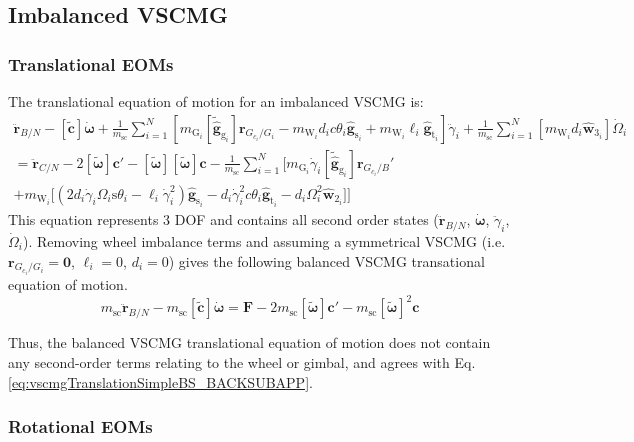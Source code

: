 \subsection{Imbalanced VSCMG}

\subsubsection{Translational EOMs}
The translational equation of motion for an imbalanced VSCMG is:
\begin{multline}
\ddot{\bm r}_{B/N} - [\tilde{\bm{c}}]\dot{\bm \omega}
+ \frac{1}{m_{\text{sc}}} \sum\limits_{i=1}^{N} \left[ m_{\text{G}_i} \left[\tilde{\hat{\bm g}}_{\text{g}_i} \right] \bm{r}_{G_{c_i}/G_i} - m_{\text{W}_i}d_ic\theta_i\hat{\bm{g}}_{\text{s}_i} + m_{\text{W}_i}\ell_i\hat{\bm{g}}_{\text{t}_i} \right] \ddot{\gamma}_i
+ \frac{1}{m_{\text{sc}}} \sum\limits_{i=1}^{N} \left[ m_{\text{W}_i}d_i\hat{\bm w}_{3_i} \right] \dot{\Omega}_i
\\= \ddot{\bm r}_{C/N} - 2[\tilde{\bm{\omega}}]\bm{c}' - [\tilde{\bm{\omega}}][\tilde{\bm{\omega}}]\bm{c}
- \frac{1}{m_{\text{sc}}} \sum\limits_{i=1}^{N} \Big[
m_{\text{G}_i}\dot{\gamma}_i[\tilde{\hat{\bm g}}_{\text{g}_i}] \bm{r}_{G_{c_i}/B}'
\\+ m_{\text{W}_i} \big[ \left(2d_i\dot{\gamma}_i\Omega_i\text{s}\theta_i - \ell_i\dot{\gamma}_i^2 \right)\hat{\bm{g}}_{\text{s}_i} - d_i\dot{\gamma}_i^2c\theta_i\hat{\bm{g}}_{\text{t}_i} - d_i\Omega_i^2 \hat{\bm{w}}_{2_i} \big] \Big]
\end{multline}
This equation represents 3 DOF and contains all second order states ($\ddot{\bm r}_{B/N}$, $\dot{\bm \omega}$, $\ddot{\gamma}_i$, $\dot{\Omega}_i$). Removing wheel imbalance terms and assuming a symmetrical VSCMG (i.e. $\bm{r}_{G_{c_i}/G_i} = \bm{0}$, $\ell_i = 0$, $d_i = 0$) gives the following balanced VSCMG transational equation of motion.
\begin{equation}
	m_\text{sc}\ddot{\bm r}_{B/N} - m_\text{sc}[\tilde{\bm{c}}]\dot{\bm \omega}
	= \bm{F} - 2m_\text{sc}[\tilde{\bm{\omega}}]\bm{c}' - m_\text{sc}[\tilde{\bm{\omega}}]^2\bm{c}
	\label{eq:vscmgTranslationSimple}
\end{equation}

Thus, the balanced VSCMG translational equation of motion does not contain any second-order terms relating to the wheel or gimbal, and agrees with Eq. \ref{eq:vscmgTranslationSimpleBS_BACKSUBAPP}.

\subsubsection{Rotational EOMs}

